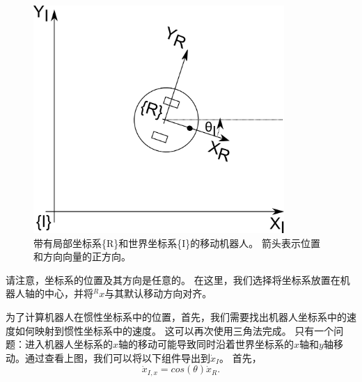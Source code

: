 \begin{figure}[htb!]
	\centering
		\includegraphics[width=0.85\textwidth]{figs/mobilerobot.png}
	\caption{带有局部坐标系\{R\}和世界坐标系\{I\}的移动机器人。 箭头表示位置和方向向量的正方向。}
	\label{fig:mobilerobot}
\end{figure}


请注意，坐标系的位置及其方向是任意的。 在这里，我们选择将坐标系放置在机器人轴的中心，并将$^Rx$与其默认移动方向对齐。


为了计算机器人在惯性坐标系中的位置，首先，我们需要找出机器人坐标系中的速度如何映射到惯性坐标系中的速度。 这可以再次使用三角法完成。 只有一个问题：进入机器人坐标系的$x$轴的移动可能导致同时沿着世界坐标系的$x$轴和$y$轴移动。通过查看上图，我们可以将以下组件导出到$\dot{x}_I$。 首先，
\begin{equation}
\dot{x}_{I,x}=cos(\theta) \dot{x}_R.
\end{equation}

